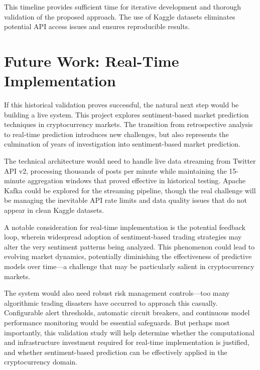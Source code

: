 \documentclass[11pt,twocolumn]{article}
\begin{document}
This timeline provides sufficient time for iterative development and thorough validation of the proposed approach. The use of Kaggle datasets eliminates potential API access issues and ensures reproducible results.

\section{Future Work: Real-Time Implementation}
If this historical validation proves successful, the natural next step would be building a live system. This project explores sentiment-based market prediction techniques in cryptocurrency markets. The transition from retrospective analysis to real-time prediction introduces new challenges, but also represents the culmination of years of investigation into sentiment-based market prediction.

The technical architecture would need to handle live data streaming from Twitter API v2, processing thousands of posts per minute while maintaining the 15-minute aggregation windows that proved effective in historical testing. Apache Kafka could be explored for the streaming pipeline, though the real challenge will be managing the inevitable API rate limits and data quality issues that do not appear in clean Kaggle datasets.

A notable consideration for real-time implementation is the potential feedback loop, wherein widespread adoption of sentiment-based trading strategies may alter the very sentiment patterns being analyzed. This phenomenon could lead to evolving market dynamics, potentially diminishing the effectiveness of predictive models over time—a challenge that may be particularly salient in cryptocurrency markets.


The system would also need robust risk management controls—too many algorithmic trading disasters have occurred to approach this casually. Configurable alert thresholds, automatic circuit breakers, and continuous model performance monitoring would be essential safeguards. But perhaps most importantly, this validation study will help determine whether the computational and infrastructure investment required for real-time implementation is justified, and whether sentiment-based prediction can be effectively applied in the cryptocurrency domain.
\end{document}
